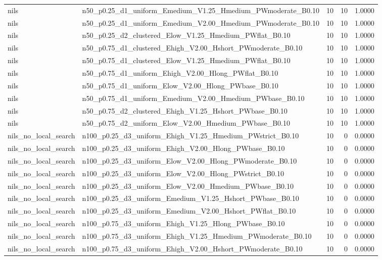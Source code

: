 \begin{tabular}{llrrr}
nils & n50_p0.25_d1_uniform_Emedium_V1.25_Hmedium_PWmoderate_B0.10 & 10 & 10 & 1.0000 \\
nils & n50_p0.25_d1_uniform_Emedium_V2.00_Hmedium_PWmoderate_B0.10 & 10 & 10 & 1.0000 \\
nils & n50_p0.25_d2_clustered_Elow_V1.25_Hmedium_PWflat_B0.10 & 10 & 10 & 1.0000 \\
nils & n50_p0.75_d1_clustered_Ehigh_V2.00_Hshort_PWmoderate_B0.10 & 10 & 10 & 1.0000 \\
nils & n50_p0.75_d1_clustered_Elow_V1.25_Hmedium_PWflat_B0.10 & 10 & 10 & 1.0000 \\
nils & n50_p0.75_d1_uniform_Ehigh_V2.00_Hlong_PWflat_B0.10 & 10 & 10 & 1.0000 \\
nils & n50_p0.75_d1_uniform_Elow_V2.00_Hlong_PWbase_B0.10 & 10 & 10 & 1.0000 \\
nils & n50_p0.75_d1_uniform_Emedium_V2.00_Hmedium_PWbase_B0.10 & 10 & 10 & 1.0000 \\
nils & n50_p0.75_d2_clustered_Ehigh_V1.25_Hshort_PWbase_B0.10 & 10 & 10 & 1.0000 \\
nils & n50_p0.75_d2_uniform_Elow_V2.00_Hmedium_PWbase_B0.10 & 10 & 10 & 1.0000 \\
nils_no_local_search & n100_p0.25_d3_uniform_Ehigh_V1.25_Hmedium_PWstrict_B0.10 & 10 & 0 & 0.0000 \\
nils_no_local_search & n100_p0.25_d3_uniform_Ehigh_V2.00_Hlong_PWbase_B0.10 & 10 & 0 & 0.0000 \\
nils_no_local_search & n100_p0.25_d3_uniform_Elow_V2.00_Hlong_PWmoderate_B0.10 & 10 & 0 & 0.0000 \\
nils_no_local_search & n100_p0.25_d3_uniform_Elow_V2.00_Hlong_PWstrict_B0.10 & 10 & 0 & 0.0000 \\
nils_no_local_search & n100_p0.25_d3_uniform_Elow_V2.00_Hmedium_PWbase_B0.10 & 10 & 0 & 0.0000 \\
nils_no_local_search & n100_p0.25_d3_uniform_Emedium_V1.25_Hshort_PWbase_B0.10 & 10 & 0 & 0.0000 \\
nils_no_local_search & n100_p0.25_d3_uniform_Emedium_V2.00_Hshort_PWflat_B0.10 & 10 & 0 & 0.0000 \\
nils_no_local_search & n100_p0.75_d3_uniform_Ehigh_V1.25_Hlong_PWbase_B0.10 & 10 & 0 & 0.0000 \\
nils_no_local_search & n100_p0.75_d3_uniform_Ehigh_V1.25_Hmedium_PWmoderate_B0.10 & 10 & 0 & 0.0000 \\
nils_no_local_search & n100_p0.75_d3_uniform_Ehigh_V2.00_Hshort_PWmoderate_B0.10 & 10 & 0 & 0.0000 \\

\end{tabular}
